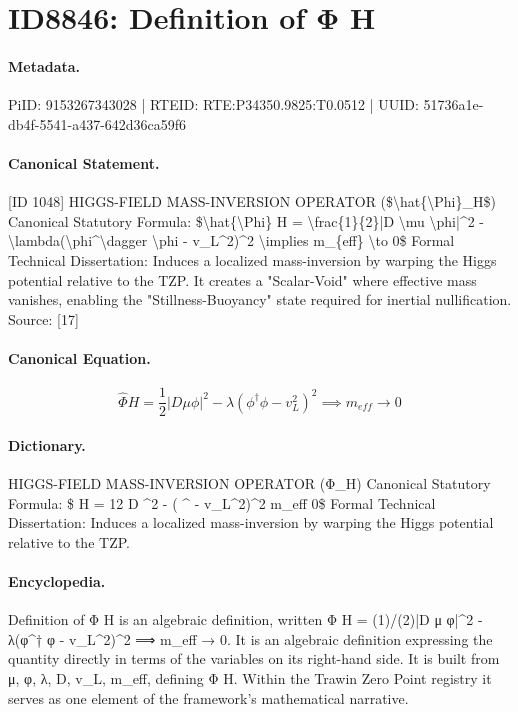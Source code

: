 \section*{ID8846: Definition of Φ H}
\paragraph{Metadata.}
PiID: 9153267343028 | RTEID: RTE:P34350.9825:T0.0512 | UUID: 51736a1e-db4f-5541-a437-642d36ca59f6

\paragraph{Canonical Statement.}
[ID 1048] HIGGS-FIELD MASS-INVERSION OPERATOR (\$\textbackslash{}hat\{\textbackslash{}Phi\}\_H\$) Canonical Statutory Formula: \$\textbackslash{}hat\{\textbackslash{}Phi\} H = \textbackslash{}frac\{1\}\{2\}|D \textbackslash{}mu \textbackslash{}phi|\textasciicircum{}2 - \textbackslash{}lambda(\textbackslash{}phi\textasciicircum{}\textbackslash{}dagger \textbackslash{}phi - v\_L\textasciicircum{}2)\textasciicircum{}2 \textbackslash{}implies m\_\{eff\} \textbackslash{}to 0\$ Formal Technical Dissertation: Induces a localized mass-inversion by warping the Higgs potential relative to the TZP. It creates a "Scalar-Void" where effective mass vanishes, enabling the "Stillness-Buoyancy" state required for inertial nullification. Source: [17]

\paragraph{Canonical Equation.}
\[
\hat{\Phi} H = \frac{1}{2}|D \mu \phi|^2 - \lambda(\phi^\dagger \phi - v_L^2)^2 \implies m_{eff} \to 0
\]

\paragraph{Dictionary.}
HIGGS-FIELD MASS-INVERSION OPERATOR (Φ\_H) Canonical Statutory Formula: \$ H = 12 D \textasciicircum{}2 - ( \textasciicircum{} - v\_L\textasciicircum{}2)\textasciicircum{}2 m\_eff 0\$ Formal Technical Dissertation: Induces a localized mass-inversion by warping the Higgs potential relative to the TZP.

\paragraph{Encyclopedia.}
Definition of Φ H is an algebraic definition, written Φ H = (1)/(2)|D μ φ|\textasciicircum{}2 - λ(φ\textasciicircum{}† φ - v\_L\textasciicircum{}2)\textasciicircum{}2 ⟹ m\_eff → 0. It is an algebraic definition expressing the quantity directly in terms of the variables on its right-hand side. It is built from μ, φ, λ, D, v\_L, m\_eff, defining Φ H. Within the Trawin Zero Point registry it serves as one element of the framework's mathematical narrative.
